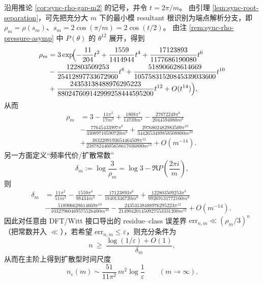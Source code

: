 \begin{corollary}\label{cor:sync-rho-gap-m8-diffusive}
沿用推论 \ref{cor:sync-rho-gap-m2} 的记号，并令 \(t=2\pi/m\)。
由引理 \ref{lem:sync-root-separation}，可先把充分大 \(m\) 下的最小模 resultant 根识别为端点解析分支，即
\(\rho_m=\rho(s_m)\)、\(s_m=2\cos(\pi/m)=2\cos(t/2)\)。
由注 \ref{rem:sync-rho-pressure-asymp} 中 \(P(\theta)\) 的 \(\theta^{12}\) 展开，得到
\[
\begin{aligned}
\rho_m
&=3\exp\!\Bigl(-\frac{11}{204}t^2+\frac{1559}{1414944}t^4+\frac{17123893}{1177686190080}t^6\\
&-\frac{122803509253}{25412897733672960}t^8+\frac{518906628614669}{10575831520845339033600}t^{10}\\
&+\frac{24353138488976295223}{880247609142999258444595200}t^{12}+O(t^{14})\Bigr),
\end{aligned}
\]
从而
\[
\boxed{\;
\begin{aligned}
\rho_m
&=3-\frac{11\pi^2}{17m^2}
+\frac{1808\pi^4}{14739m^4}
-\frac{27872249\pi^6}{2044594080m^6}\\
&-\frac{77645433997\pi^8}{33089710590720m^8}
+\frac{2976802482983509\pi^{10}}{3442653489858508800m^{10}}\\
&+\frac{3832209193654464509\pi^{12}}{23878244605658617036800m^{12}}
+O(m^{-14}).\;
\end{aligned}\;}
\]
另一方面定义“频率代价/扩散常数”
\[
\delta_m:=\log\frac{3}{\rho_m}=\log 3-\Re P\!\left(\frac{2\pi i}{m}\right),
\]
则
\[
\boxed{\;
\begin{aligned}
\delta_m
&=\frac{11\pi^2}{51m^2}
-\frac{1559\pi^4}{88434m^4}
-\frac{17123893\pi^6}{18401346720m^6}
+\frac{122803509253\pi^8}{99269131772160m^8}\\
&-\frac{518906628614669\pi^{10}}{10327960469575526400m^{10}}
-\frac{24353138488976295223\pi^{12}}{214904201450927553331200m^{12}}
+O(m^{-14}).\;
\end{aligned}\;}
\]
因此对任意由 DFT/Witt 接口导出的 residue--class 误差界
\(
\mathrm{err}_{n,m}\ll (\rho_m/3)^n
\)
（把常数并入 \(\ll\)），若希望 \(\mathrm{err}_{n,m}\le \varepsilon\)，则充分条件为
\[
n\ \ge\ \frac{\log(1/\varepsilon)+O(1)}{\delta_m},
\]
从而在主阶上得到扩散型时间尺度
\[
\boxed{\;
n_\varepsilon(m)\sim \frac{51}{11\pi^2}\,m^2\log\frac{1}{\varepsilon}\qquad(m\to\infty).\;}
\]
\end{corollary}



